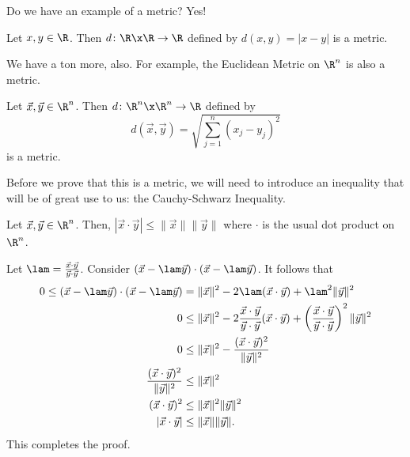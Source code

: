 \documentclass[class=article, crop=false]{standalone}
\begin{document}
Do we have an example of a metric? Yes!
\begin{ex}
    Let $x,y \in \R$. Then $d \colon \R \x \R \to \R$ defined by $d(x,y) = |x-y|$ is a metric.
\end{ex}
We have a ton more, also. For example, the Euclidean Metric on $\R^n$ is also a metric.
\begin{ex}
    Let $\vec x, \vec y \in \R^n$. Then $d \colon \R^n \x \R^n \to \R$ defined by
        \[
            d(\vec x, \vec y) = \sqrt{\sum_{j=1}^{n} (x_j-y_j)^2}
        \]
    is a metric.
\end{ex}

Before we prove that this is a metric, we will need to introduce an inequality that will be of great use to us: the Cauchy-Schwarz Inequality.

\begin{thm}
    Let $\vec x, \vec y \in \R^n$. Then, $| \vec x \cdot \vec y| \leq \| \vec x \| \| \vec y \|$ where $\cdot$ is the usual dot product on $\R^n$.
\end{thm}
\begin{pf}
    Let $\lam = \frac{\vec x \cdot \vec y}{\vec y \cdot \vec y}$. Consider $(\vec x - \lam \vec y) \cdot (\vec x - \lam \vec y)$. It follows that
        \begin{align*}
            0 \leq (\vec x - \lam \vec y) \cdot (\vec x - \lam \vec y) &= \| \vec x \|^2 - 2 \lam (\vec x \cdot \vec y) + \lam^2 \| \vec y \|^2 \\
            0 &\leq \| \vec x \|^2 - 2 \frac{\vec x \cdot \vec y}{\vec y \cdot \vec y} (\vec x \cdot \vec y) + \left( \frac{\vec x \cdot \vec y}{\vec y \cdot \vec y} \right)^2 \| \vec y \|^2 \\
            0 &\leq \| \vec x \|^2 - \frac{(\vec x \cdot \vec y)^2}{\| \vec y\|^2} \\
            \frac{(\vec x \cdot \vec y)^2}{\| \vec y\|^2} &\leq \| \vec x \|^2 \\
            (\vec x \cdot \vec y)^2 &\leq \| \vec x\|^2 \| \vec y \|^2 \\
            | \vec x \cdot \vec y| &\leq \| \vec x \| \| \vec y \|.
        \end{align*}
    This completes the proof.
\end{pf}
\end{document}
